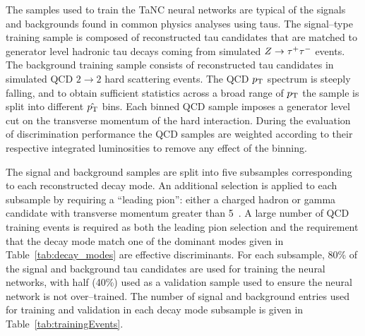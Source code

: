 The samples used to train the TaNC neural networks are typical of the signals
and backgrounds found in common physics analyses using taus.  The signal--type
training sample is composed of reconstructed tau candidates that are matched to
generator level hadronic tau decays coming from simulated $\mbox{\ensuremath{Z\to\tau^+\tau^-}}$ events.  The
background training sample consists of reconstructed tau candidates in
simulated QCD $2\rightarrow2$ hard scattering events.  The QCD $p_{\mathrm{T}}$ spectrum is
steeply falling, and to obtain sufficient statistics across a broad range of
$p_{\mathrm{T}}$ the sample is split into different $\hat {p_{\mathrm{T}}}$ bins.  Each binned QCD
sample imposes a generator level cut on the transverse momentum of the hard
interaction.  During the evaluation of discrimination performance the QCD
samples are weighted according to their respective integrated luminosities to
remove any effect of the binning.

The signal and background samples are split into five subsamples corresponding
to each reconstructed decay mode.  An additional selection is applied to each
subsample by requiring a ``leading pion'': either a charged hadron or gamma
candidate with transverse momentum greater than 5~\GeVc.  A large number of QCD
training events is required as both the leading pion selection and the
requirement that the decay mode match one of the dominant modes given in
Table~\ref{tab:decay_modes} are effective discriminants.  For each subsample,
80\% of the signal and background tau candidates are used for training the
neural networks, with half (40\%) used as a
validation sample used to ensure the neural network is not over--trained. The
number of signal and background entries used for training and validation in each
decay mode subsample is given in Table~\ref{tab:trainingEvents}.


